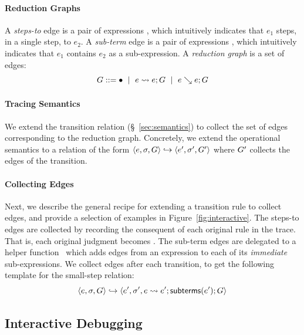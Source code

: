 \paragraph{Reduction Graphs}
%
A \emph{steps-to} edge is a pair of expressions , which
intuitively indicates that $e_1$ steps, in a single step, to $e_2$.
%
A \emph{sub-term} edge is a pair of expressions , which
intuitively indicates that $e_1$ contains $e_2$ as a sub-expression.
%
A \emph{reduction graph} is a set of edges:
$$G ::= \bullet \ \mid \  e \leadsto e; G \ \mid \  e \searrow e; G$$

\paragraph{Tracing Semantics}
%
We extend the transition relation (\S~\ref{sec:semantics}) to
collect the set of edges corresponding to the reduction graph.
%
Concretely, we extend the operational semantics to
a relation of the form $\langle e, \sigma, G \rangle \hookrightarrow \langle e', \sigma', G' \rangle$
where $G'$ collects the edges of the transition.

\paragraph{Collecting Edges}
%
Next, we describe the general recipe for extending a transition
rule to collect edges, and provide a selection of examples
in Figure~\ref{fig:interactive}.
%
The steps-to edges are collected by recording the consequent of
each original rule in the trace. That is, each original judgment
 becomes
.
%
The sub-term edges are delegated to a helper function \subtermssym\
which adds edges from an expression to each of its
\emph{immediate} sub-expressions.
%
We collect \subtermssym edges after each transition,
to get the following template for the small-step relation:
\[
\langle e, \sigma, G \rangle \hookrightarrow \langle e', \sigma', e \leadsto e'; \mathsf{subterms}(e'); G \rangle
\]


\subsection{Interactive Debugging}
\label{sec:traversing-graph}

